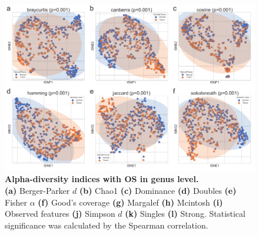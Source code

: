 \documentclass[11pt, a4paper, onecolumn, oneside]{report}
\begin{document}
            \begin{figure}[p]
                \centering
                \includegraphics[width=\linewidth]{Figures/CRC/Figure_04.pdf}
                \caption[Alpha-diversity indices with OS in genus level]{\textbf{Alpha-diversity indices with OS in genus level.}\\
                    \textbf{(a)} Berger-Parker $d$ \textbf{(b)} Chao1 \textbf{(c)} Dominance \textbf{(d)} Doubles \textbf{(e)} Fisher $\alpha$ \textbf{(f)} Good's coverage \textbf{(g)} Margalef \textbf{(h)} Mcintosh \textbf{(i)} Observed features \textbf{(j)} Simpson $d$ \textbf{(k)} Singles \textbf{(l)} Strong. Statistical significance was calculated by the Spearman correlation.}
                \label{fig:CRC-alpha-OS}
            \end{figure}
            \clearpage
\end{document}

